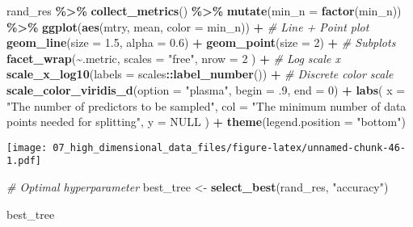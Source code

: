 \documentclass[
]{book}
\newenvironment{Shaded}{\begin{snugshade}}{\end{snugshade}}
\newcommand{\CommentTok}[1]{\textcolor[rgb]{0.56,0.35,0.01}{\textit{#1}}}
\newcommand{\DataTypeTok}[1]{\textcolor[rgb]{0.13,0.29,0.53}{#1}}
\newcommand{\DecValTok}[1]{\textcolor[rgb]{0.00,0.00,0.81}{#1}}
\newcommand{\FloatTok}[1]{\textcolor[rgb]{0.00,0.00,0.81}{#1}}
\newcommand{\KeywordTok}[1]{\textcolor[rgb]{0.13,0.29,0.53}{\textbf{#1}}}
\newcommand{\NormalTok}[1]{#1}
\newcommand{\OperatorTok}[1]{\textcolor[rgb]{0.81,0.36,0.00}{\textbf{#1}}}
\newcommand{\OtherTok}[1]{\textcolor[rgb]{0.56,0.35,0.01}{#1}}
\newcommand{\StringTok}[1]{\textcolor[rgb]{0.31,0.60,0.02}{#1}}
\begin{document}
\begin{Shaded}
\begin{Highlighting}[]
\NormalTok{rand\_res }\OperatorTok{\%\textgreater{}\%}
\StringTok{  }\KeywordTok{collect\_metrics}\NormalTok{() }\OperatorTok{\%\textgreater{}\%}
\StringTok{  }\KeywordTok{mutate}\NormalTok{(}\DataTypeTok{min\_n =} \KeywordTok{factor}\NormalTok{(min\_n)) }\OperatorTok{\%\textgreater{}\%}
\StringTok{  }\KeywordTok{ggplot}\NormalTok{(}\KeywordTok{aes}\NormalTok{(mtry, mean, }\DataTypeTok{color =}\NormalTok{ min\_n)) }\OperatorTok{+}
\StringTok{  }\CommentTok{\# Line + Point plot}
\StringTok{  }\KeywordTok{geom\_line}\NormalTok{(}\DataTypeTok{size =} \FloatTok{1.5}\NormalTok{, }\DataTypeTok{alpha =} \FloatTok{0.6}\NormalTok{) }\OperatorTok{+}
\StringTok{  }\KeywordTok{geom\_point}\NormalTok{(}\DataTypeTok{size =} \DecValTok{2}\NormalTok{) }\OperatorTok{+}
\StringTok{  }\CommentTok{\# Subplots}
\StringTok{  }\KeywordTok{facet\_wrap}\NormalTok{(}\OperatorTok{\textasciitilde{}}\NormalTok{.metric,}
    \DataTypeTok{scales =} \StringTok{"free"}\NormalTok{,}
    \DataTypeTok{nrow =} \DecValTok{2}
\NormalTok{  ) }\OperatorTok{+}
\StringTok{  }\CommentTok{\# Log scale x}
\StringTok{  }\KeywordTok{scale\_x\_log10}\NormalTok{(}\DataTypeTok{labels =}\NormalTok{ scales}\OperatorTok{::}\KeywordTok{label\_number}\NormalTok{()) }\OperatorTok{+}
\StringTok{  }\CommentTok{\# Discrete color scale}
\StringTok{  }\KeywordTok{scale\_color\_viridis\_d}\NormalTok{(}\DataTypeTok{option =} \StringTok{"plasma"}\NormalTok{, }\DataTypeTok{begin =} \FloatTok{.9}\NormalTok{, }\DataTypeTok{end =} \DecValTok{0}\NormalTok{) }\OperatorTok{+}
\StringTok{  }\KeywordTok{labs}\NormalTok{(}
    \DataTypeTok{x =} \StringTok{"The number of predictors to be sampled"}\NormalTok{,}
    \DataTypeTok{col =} \StringTok{"The minimum number of data points needed for splitting"}\NormalTok{,}
    \DataTypeTok{y =} \OtherTok{NULL}
\NormalTok{  ) }\OperatorTok{+}
\StringTok{  }\KeywordTok{theme}\NormalTok{(}\DataTypeTok{legend.position =} \StringTok{"bottom"}\NormalTok{)}
\end{Highlighting}
\end{Shaded}

\texttt{[image: 07\_high\_dimensional\_data\_files/figure-latex/unnamed-chunk-46-1.pdf]}

\begin{Shaded}
\begin{Highlighting}[]
\CommentTok{\# Optimal hyperparameter}
\NormalTok{best\_tree \textless{}{-}}\StringTok{ }\KeywordTok{select\_best}\NormalTok{(rand\_res, }\StringTok{"accuracy"}\NormalTok{)}

\NormalTok{best\_tree}
\end{Highlighting}
\end{Shaded}
\end{document}
